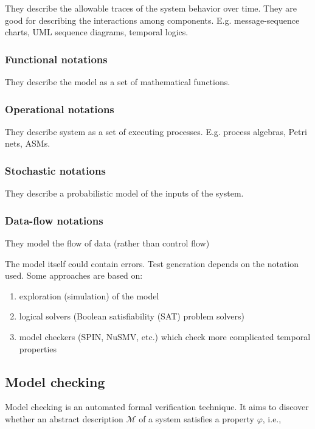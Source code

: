 They describe the allowable traces of the system behavior over time. They are good for describing the interactions among components. E.g. message-sequence charts, UML sequence diagrams, temporal logics.

\subsubsection{Functional notations}

They describe the model as a set of mathematical functions.

\subsubsection{Operational notations}

They describe system as a set of executing processes. E.g. process algebras, Petri nets, ASMs.

\subsubsection{Stochastic notations}

They describe a probabilistic model of the inputs of the system.

\subsubsection{Data-flow notations}

They model the flow of data (rather than control flow)

The model itself could contain errors. Test generation depends on the notation used. Some approaches are based on:

\begin{enumerate}
	\item exploration (simulation) of the model
	\item logical solvers (Boolean satisfiability (SAT) problem solvers)
	\item model checkers (SPIN, NuSMV, etc.) which check more complicated temporal properties
\end{enumerate}

\subsection{Model checking}

Model checking is an automated formal verification technique. It aims to discover whether an abstract description $\mathcal{M}$ of a system satisfies a property $\varphi$, i.e.,

